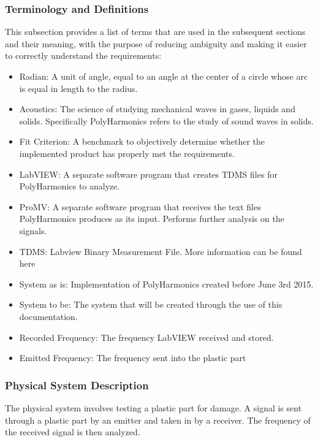 \documentclass[12pt]{article}
\newcommand{\progname}{PolyHarmonics}
\begin{document}
\subsubsection{Terminology and  Definitions}

This subsection provides a list of terms that are used in the subsequent
sections and their meaning, with the purpose of reducing ambiguity and making it
easier to correctly understand the requirements:

\begin{itemize}

\item Radian: A unit of angle, equal to an angle at the center of a circle whose
  arc is equal in length to the radius.
\item Acoustics: The science of studying mechanical waves in gases, liquids and
  solids. Specifically \progname{} refers to the study of sound waves in solids.
\item Fit Criterion: A benchmark to objectively determine whether the
  implemented product has properly met the requirements.
\item LabVIEW: A separate software program that creates TDMS files for 
\progname{} to analyze.
\item ProMV: A separate software program that receives the text files
  \progname{} produces as its input. Performs further analysis on the signals.
\item TDMS: Labview Binary Measurement File. More information can be found here 
\cite{TDMS}\\
\item System as is: Implementation of PolyHarmonics created before June 3rd 
2015.
\item System to be: The system that will be created through the use of this 
documentation.
\item Recorded Frequency: The frequency LabVIEW received and stored.
\item Emitted Frequency: The frequency sent into the plastic part
\end{itemize}

\subsubsection{Physical System Description}

The physical system involves testing a plastic part for damage. A signal is sent 
through a plastic part by an emitter and taken in by a receiver. The frequency 
of the received signal is then analyzed.
\end{document}
